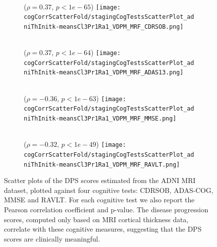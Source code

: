 \newcommand{\figFont}{\normalfont}
\newcommand{\pValFont}{\footnotesize}

\newcommand{\cogCorrScatterFold}{\voxDpmFolder/resfiles/adniThInitk-meansCl3Pr1Ra1_VDPM_MRF}

\begin{figure}[h]
  \begin{subfigure}{0.245\textwidth}
    \centering
    \hspace{1.5em}\figFont{CDRSOB}\\ 
    \hspace{1.5em}\pValFont{($\rho = 0.37$, $p < 1e-65$)}
    \texttt{[image: \\cogCorrScatterFold/stagingCogTestsScatterPlot\_adniThInitk-meansCl3Pr1Ra1\_VDPM\_MRF\_CDRSOB.png]}
  \end{subfigure}
  \begin{subfigure}{0.245\textwidth}
    \centering
    \hspace{1.5em}\figFont{ADAS-COG}\\ 
    \hspace{1.5em}\pValFont{($\rho = 0.37$, $p < 1e-64$)}
    \texttt{[image: \\cogCorrScatterFold/stagingCogTestsScatterPlot\_adniThInitk-meansCl3Pr1Ra1\_VDPM\_MRF\_ADAS13.png]}
  \end{subfigure}
    \begin{subfigure}{0.245\textwidth}
    \centering
    \hspace{1.4em}\figFont{MMSE}\\ 
    \hspace{1.4em}\pValFont{($\rho = -0.36$, $p < 1e-63$)}
    \texttt{[image: \\cogCorrScatterFold/stagingCogTestsScatterPlot\_adniThInitk-meansCl3Pr1Ra1\_VDPM\_MRF\_MMSE.png]}
  \end{subfigure}
    \begin{subfigure}{0.245\textwidth}
    \centering
    \hspace{1.4em}\figFont{RAVLT}\\ 
    \hspace{1.4em}\pValFont{($\rho = -0.32$, $p < 1e-49$)}
    \texttt{[image: \\cogCorrScatterFold/stagingCogTestsScatterPlot\_adniThInitk-meansCl3Pr1Ra1\_VDPM\_MRF\_RAVLT.png]}
  \end{subfigure}
  \caption[Scatter plot of DIVE-derived DPS scores vs cognitive tests]{Scatter plots of the DPS scores estimated from the ADNI MRI dataset, plotted against four cognitive tests: CDRSOB, ADAS-COG, MMSE and RAVLT. For each cognitive test we also report the Pearson correlation coefficient and p-value. The disease progression scores, computed only based on MRI cortical thickness data, correlate with these cognitive measures, suggesting that the DPS scores are clinically meaningful. }
  \label{fig:diveCogCorr}
\end{figure}



